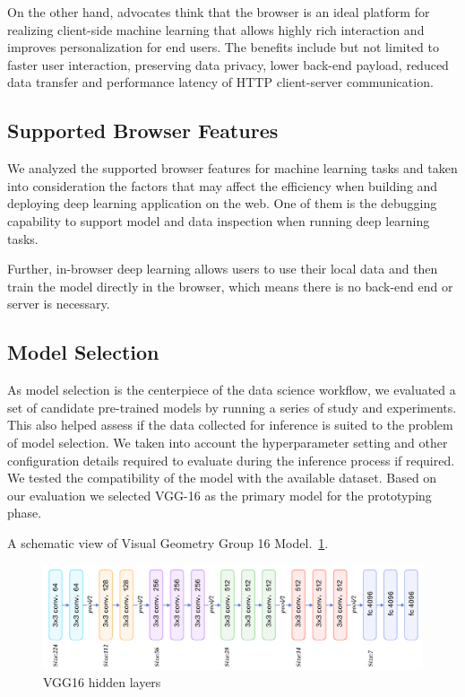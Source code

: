 On the other hand, advocates think that the browser is an ideal platform for realizing client-side machine learning that allows highly rich interaction and improves personalization for end users. The benefits include but not limited to faster user interaction, preserving data privacy, lower back-end payload, reduced data transfer and performance latency of HTTP client-server communication.

\subsection{Supported Browser Features}
We analyzed the supported browser features for machine learning tasks and taken into consideration the factors that may affect the efficiency when building and deploying deep learning application on the web. One of them is the debugging capability to support model and data inspection when running deep learning tasks.

Further, in-browser deep learning allows users to use their local data and then train the model directly in the browser, which means there is no back-end end or server is necessary. 

\subsection{Model Selection}

As model selection is the centerpiece of the data science workflow, we evaluated a set of candidate pre-trained models by running a series of study and experiments. This also helped assess if the data collected for inference is suited to the problem of model selection. We taken into account the hyperparameter setting and other configuration details required to evaluate during the inference process if required. We tested the compatibility of the model with the available dataset. Based on our evaluation we selected VGG-16 as the primary model for the prototyping phase.

A schematic view of Visual Geometry Group 16 Model.~\ref{fig:CNN-2}.
\begin{figure}[htbp]
\centering
\includegraphics[width=1\textwidth]{images/cnn-vgg16-1.png}
\caption{VGG16 hidden layers}
\label{fig:CNN-2}
\end{figure}

